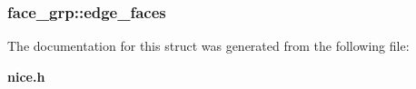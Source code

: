 \subsubsection{ {\bf face\_\-grp::edge\_\-faces}}\label{structface__grp_24708d04ab4911b8d1f82a28ade452b7}




The documentation for this struct was generated from the following file:\begin{CompactItemize}
\item 
{\bf nice.h}\end{CompactItemize}
